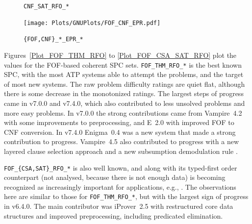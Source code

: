 \documentclass[runningheads]{llncs}
\begin{document}
\begin{figure}[h!]
\begin{minipage}[t]{.49\textwidth}
  \vspace*{-2em}
  \caption{{\tt CNF\_SAT\_RFO\_*}}
  \label{Plot_CNF_SAT}
\end{minipage}
\begin{minipage}[t]{.49\textwidth}
  \centering
  \texttt{[image: Plots/GNUPlots/FOF\_CNF\_EPR.pdf]}
  \vspace*{-2em}
  \caption{{\tt \{FOF,CNF\}\_*\_EPR\_*}}
  \label{Plot_FOF_CNF_EPR}
\end{minipage}
\end{figure}

Figures~\ref{Plot_FOF_THM_RFO} to \ref{Plot_FOF_CSA_SAT_RFO} plot the values for the FOF-based 
coherent SPC sets.
{\tt FOF\_THM\_RFO\_*} is the best known SPC, with the most ATP systems able to attempt the 
problems, and the target of most new systems.
The raw problem difficulty ratings are quiet flat, although there is some decrease in the
monotonized ratings.
The largest steps of progress came in v7.0.0 and v7.4.0, which also contributed to less unsolved
problems and more easy problems.
In v7.0.0 the strong contributions came from Vampire~4.2 with some improvements to preprocessing, 
and E~2.0 with improved FOF to CNF conversion.
In v7.4.0 Enigma~0.4 \cite{JU17,JC+20} was a new system that made a strong contribution to 
progress.
Vampire~4.5 also contributed to progress with a new layered clause selection approach 
\cite{GS20} and a new subsumption demodulation rule \cite{GKR20}.

{\tt FOF\_\{CSA,SAT\}\_RFO\_*} is also well known, and along with its typed-first order
counterpart (not analysed, because there is not enough data) is becoming recognized as 
increasingly important for applications, e.g., \cite{DKW08}.
The observations here are similar to those for {\tt FOF\_THM\_RFO\_*}, but with the largest
sign of progress in v6.4.0.
The main contributor was iProver~2.5 with restructured core data structures and improved 
preprocessing, including predicated elimination.
\end{document}
